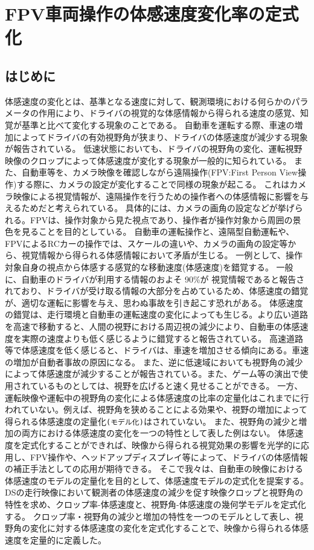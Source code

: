 \chapter{FPV車両操作の体感速度変化率の定式化}
\section{はじめに}
体感速度の変化とは、基準となる速度に対して、観測環境における何らかのパラメータの作用により、ドライバの視覚的な体感情報から得られる速度の感覚、知覚が基準と比べて変化する現象のことである。
自動車を運転する際、車速の増加によってドライバの有効視野角が狭まり、ドライバの体感速度が減少する現象が報告されている。
低速状態においても、ドライバの視野角の変化、運転視野映像のクロップによって体感速度が変化する現象が一般的に知られている。
また、自動車等を、カメラ映像を確認しながら遠隔操作(FPV:First Person View操作)する際に、カメラの設定が変化することで同様の現象が起こる。
これはカメラ映像による視覚情報が、遠隔操作を行うための操作者への体感情報に影響を与えるためだと考えられている。
具体的には、カメラの画角の設定などが挙げられる。FPVは、操作対象から見た視点であり、操作者が操作対象から周囲の景色を見ることを目的としている。
自動車の運転操作と、遠隔型自動運転や、FPVによるRCカーの操作では、スケールの違いや、カメラの画角の設定等から、視覚情報から得られる体感情報において矛盾が生じる。
一例として、操作対象自身の視点から体感する感覚的な移動速度(体感速度)を錯覚する。
一般に、自動車のドライバが利用する情報のおよそ 90\%が 視覚情報であると報告されており、ドライバが受け取る情報の大部分を占めているため、体感速度の錯覚が、適切な運転に影響を与え、思わぬ事故を引き起こす恐れがある。
体感速度の錯覚は、走行環境と自動車の運転速度の変化によっても生じる。より広い道路を高速で移動すると、人間の視野における周辺視の減少により、自動車の体感速度を実際の速度よりも低く感じるように錯覚すると報告されている。
高速道路等で体感速度を低く感じると、ドライバは、車速を増加させる傾向にある。車速の増加が自動者事故の原因になる。
また、逆に低速域においても視野角の減少によって体感速度が減少することが報告されている。また、ゲーム等の演出で使用されているものとしては、視野を広げると速く見せることができる。
一方、運転映像や運転中の視野角の変化による体感速度の比率の定量化はこれまでに行われていない。例えば、視野角を狭めることによる効果や、視野の増加によって得られる体感速度の定量化\verb|(モデル化)|はされていない。
また、視野角の減少と増加の両方における体感速度の変化を一つの特性として表した例はない。
体感速度を定式化することができれば、映像から得られる視覚効果の影響を光学的に応用し、FPV操作や、ヘッドアップディスプレイ等によって、ドライバの体感情報の補正手法としての応用が期待できる。
そこで我々は、自動車の映像における体感速度のモデルの定量化を目的として、体感速度モデルの定式化を提案する。
DSの走行映像において観測者の体感速度の減少を促す映像クロップと視野角の特性を求め、クロップ率-体感速度と、視野角-体感速度の幾何学モデルを定式化する。
クロップ率・視野角の減少と増加の特性を一つのモデルとして表し、視野角の変化に対する体感速度の変化を定式化することで、映像から得られる体感速度を定量的に定義した。

